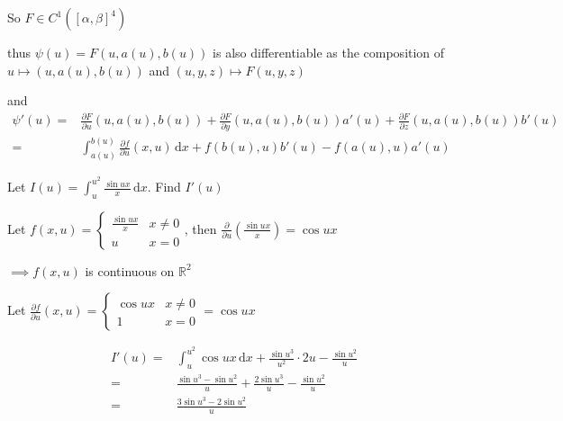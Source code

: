 So $F\in C^1\left([\alpha,\beta]^4\right)$

thus $\psi(u)=F(u,a(u),b(u))$ is also differentiable as the composition of $u\mapsto(u,a(u),b(u))$ and $(u,y,z)\mapsto F(u,y,z)$

and
\begin{align*}
    \psi'(u)= & \frac{\partial F}{\partial u}(u,a(u),b(u))+\frac{\partial F}{\partial y}(u,a(u),b(u))a'(u)+\frac{\partial F}{\partial z}(u,a(u),b(u))b'(u) \\
    =         & \int_{a(u)}^{b(u)}\frac{\partial f}{\partial u}(x,u)\,\mathrm{d}x+f(b(u),u)b'(u)-f(a(u),u)a'(u)
\end{align*}

\begin{example}
    Let $I(u)=\int_u^{u^2}\frac{\sin ux}{x}\,\mathrm{d}x$. Find $I'(u)$

    Let $f(x,u)=\begin{cases}
            \frac{\sin ux}{x} & x\neq 0 \\
            u                 & x=0
        \end{cases}$, then $\frac{\partial}{\partial u}\left(\frac{\sin ux}{x}\right)=\cos ux$

    $\implies f(x,u)$ is continuous on $\mathbb{R}^2$

    Let $\frac{\partial f}{\partial u}(x,u)=\begin{cases}
            \cos ux & x\neq 0 \\
            1       & x=0
        \end{cases}=\cos ux$

    \begin{align*}
        I'(u)= & \int_u^{u^2}\cos ux\,\mathrm{d}x+\frac{\sin u^3}{u^2}\cdot 2u-\frac{\sin u^2}{u} \\
        =      & \frac{\sin u^3-\sin u^2}{u}+\frac{2\sin u^3}{u}-\frac{\sin u^2}{u}               \\
        =      & \frac{3\sin u^3-2\sin u^2}{u}
    \end{align*}
\end{example}